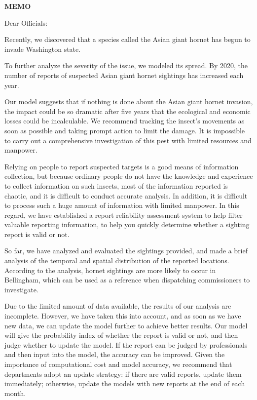 \documentclass[13pt]{ctexart}
\begin{document}
\setmainfont{texgyrepagella-regular.otf} 
\newpage
{}
\thispagestyle{empty}

{\centering \fontsize{18pt}{14pt}\selectfont \textbf{MEMO}\par}
\noindent Dear Officials:

\vspace{10pt}



Recently, we discovered that a species called the Asian giant hornet has begun to invade Washington state.

To further analyze the severity of the issue, we modeled its spread.
By 2020, the number of reports of suspected Asian giant hornet sightings has increased each year.

Our model suggests that if nothing is done about the Asian giant hornet invasion, the impact could be so dramatic after five years that the ecological and economic losses could be incalculable.
We recommend tracking the insect's movements as soon as possible and taking prompt action to limit the damage.
It is impossible to carry out a comprehensive investigation of this pest with limited resources and manpower.

Relying on people to report suspected targets is a good means of information collection, but because ordinary people do not have the knowledge and experience to collect information on such insects, most of the information reported is chaotic, and it is difficult to conduct accurate analysis.
In addition, it is difficult to process such a huge amount of information with limited manpower.
In this regard, we have established a report reliability assessment system to help filter valuable reporting information, to help you quickly determine whether a sighting report is valid or not.

So far, we have analyzed and evaluated the sightings provided, and made a brief analysis of the temporal and spatial distribution of the reported locations. According to the analysis, hornet sightings are more likely to occur in Bellingham, which can be used as a reference when dispatching commissioners to investigate.

Due to the limited amount of data available, the results of our analysis are incomplete.
However, we have taken this into account, and as soon as we have new data, we can update the model further to achieve better results.
Our model will give the probability index of whether the report is valid or not, and then judge whether to update the model.
If the report can be judged by professionals and then input into the model, the accuracy can be improved.
Given the importance of computational cost and model accuracy, we recommend that departments adopt an update strategy: if there are valid reports, update them immediately; otherwise, update the models with new reports at the end of each month.
\end{document}
